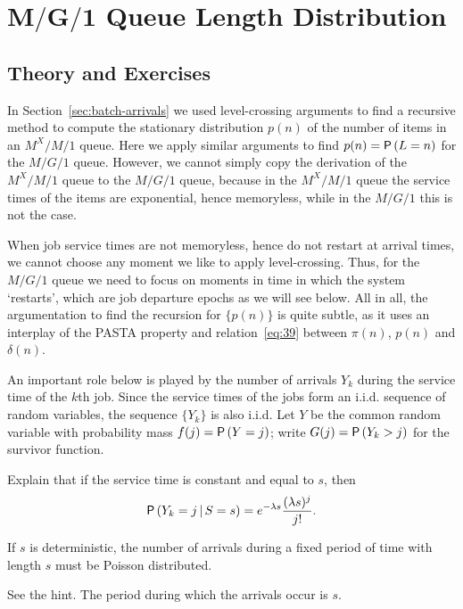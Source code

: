 \section
[$M/G/1$ Queue Length Distribution]
{$\mathbf{M/G/1}$ Queue Length Distribution}
\label{sec:distr-queue-length}


\subsection*{Theory and Exercises}



In Section~\ref{sec:batch-arrivals} we used level-crossing arguments to find a recursive method to compute the stationary distribution $p(n)$ of the number of items in an $M^X/M/1$ queue.
Here we apply similar arguments to find $p(n)=\P{L=n}$ for the $M/G/1$ queue.
However, we cannot simply copy the derivation of the $M^X/M/1$ queue to the $M/G/1$ queue, because in the $M^X/M/1$ queue the service times of the items are exponential, hence memoryless, while in the $M/G/1$ this is not the case.


When job service times are not memoryless, hence do not restart at arrival times, we cannot choose any moment we like to apply level-crossing.
Thus, for the $M/G/1$ queue we need to focus on moments in time in which the system `restarts', which  are job departure epochs as we will see below.
All in all, the argumentation to find the recursion for $\{p(n)\}$ is quite subtle, as it uses an interplay of the PASTA property and relation~\eqref{eq:39} between $\pi(n)$, $p(n)$ and $\delta(n)$.

An important role below is played by  the number of  arrivals $Y_k$ during the service time of the $k$th job.  Since the service times of the jobs form an i.i.d. sequence of random variables, the sequence $\{Y_k\}$ is also i.i.d. Let $Y$ be the common random variable with probability mass
 $f(j) = \P{Y = j}$; write $G(j) = \P{Y_k > j}$ for the survivor function.


\begin{exercise}[\faPhoto]
 Explain that if the service time is constant and equal to $s$, then
\begin{equation}\label{eq:4}
  \P{Y_k = j\given S=s} = e^{-\lambda s}\frac{(\lambda s)^j}{j!}.
\end{equation}
\begin{hint}
If $s$ is deterministic, the number of arrivals during a fixed
    period of time with length $s$ must be Poisson distributed.
\end{hint}
  \begin{solution}
See the hint.  The period during which the arrivals occur is $s$. 
  \end{solution}
\end{exercise}

